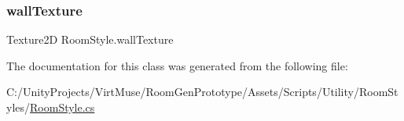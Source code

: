 \subsubsection{\texorpdfstring{wall\+Texture}{wallTexture}}
{\footnotesize\ttfamily Texture2D Room\+Style.\+wall\+Texture}



The documentation for this class was generated from the following file\+:\begin{DoxyCompactItemize}
\item 
C\+:/\+Unity\+Projects/\+Virt\+Muse/\+Room\+Gen\+Prototype/\+Assets/\+Scripts/\+Utility/\+Room\+Styles/\mbox{\hyperlink{_room_styles_2_room_style_8cs}{Room\+Style.\+cs}}\end{DoxyCompactItemize}

